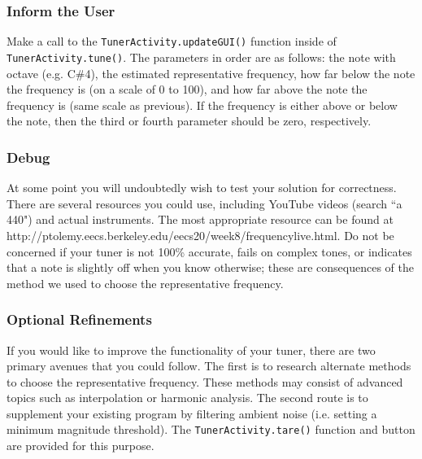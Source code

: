 \subsubsection{Inform the User}
Make a call to the \verb=TunerActivity.updateGUI()= function inside of \verb=TunerActivity.tune()=.
The parameters in order are as follows: the note with octave (e.g. C\#4),  the estimated representative frequency, how far below the note the frequency is (on a scale of 0 to 100), and how far above the note the frequency is (same scale as previous).
If the frequency is either above or below the note, then the third or fourth parameter should be zero, respectively.

\subsubsection{Debug}
At some point you will undoubtedly wish to test your solution for correctness.
There are several resources you could use, including YouTube videos (search ``a 440") and actual instruments.
The most appropriate resource can be found at http://ptolemy.eecs.berkeley.edu/eecs20/week8/frequencylive.html.
Do not be concerned if your tuner is not 100\% accurate, fails on complex tones, or indicates that a note is slightly off when you know otherwise; these are consequences of the method we used to choose the representative frequency.

\subsubsection{Optional Refinements}
If you would like to improve the functionality of your tuner, there are two primary avenues that you could follow.
The first is to research alternate methods to choose the representative frequency.
These methods may consist of advanced topics such as interpolation or harmonic analysis.
The second route is to supplement your existing program by filtering ambient noise (i.e. setting a minimum magnitude threshold).
The \verb=TunerActivity.tare()= function and button are provided for this purpose.

